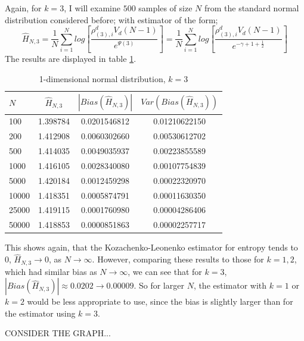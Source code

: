 \documentclass{article}
\begin{document}
Again, for $k=3$, I will examine $500$ samples of size $N$ from the standard normal distribution considered before; with estimator of the form;
\begin{equation}
\hat{H}_{N, 3} = \frac{1}{N} \sum_{i=1}^{N} log \left[ \frac{\rho_{(3),i}^{d} V_{d} (N-1)}{e^{\Psi(3)}} \right] = \frac{1}{N} \sum_{i=1}^{N} log \left[ \frac{\rho_{(3),i}^{d} V_{d} (N-1)}{e^{-\gamma + 1 + \frac{1}{2}}} \right] \nonumber
\end{equation}
The results are displayed in table \ref{normal_k=3_table}. 

\begin{table}
\caption{1-dimensional normal distribution, $k=3$} \label{normal_k=3_table}
\begin{center}
\begin{tabular}{| l | c c c|} 
\toprule
$N$ & $\hat{H}_{N, 3}$ & $|Bias(\hat{H}_{N, 3})|$ & $Var(Bias(\hat{H}_{N, 3}))$ \\
\midrule[1pt]
100     & 1.398784     & 0.0201546812     & 0.01210622150  \\
200     & 1.412908     & 0.0060302660     & 0.00530612702  \\
500     & 1.414035     & 0.0049035937     & 0.00223855589  \\
1000    & 1.416105     & 0.0028340080     & 0.00107754839  \\
5000    & 1.420184     & 0.0012459298     & 0.00022320970  \\
10000   & 1.418351     & 0.0005874791     & 0.00011630350  \\
25000   & 1.419115     & 0.0001760980     & 0.00004286406  \\
50000   & 1.418853     & 0.0000851863     & 0.00002257717  \\
\hline
\end{tabular}
\end{center}
\end{table}

This shows again, that the Kozachenko-Leonenko estimator for entropy tends to 0, $\hat{H}_{N, 3} \to 0$, as $N \to \infty$. However, comparing these results to those for $k=1, 2$, which had similar bias as $N \to \infty$, we can see that for $k=3$, $|Bias(\hat{H}_{N, 3})| \approx 0.0202 \to 0.00009$. So for larger $N$, the estimator with $k=1$ or $k=2$ would be less appropriate to use, since the bias is slightly larger than for the estimator using $k=3$.

CONSIDER THE GRAPH...
\end{document}
